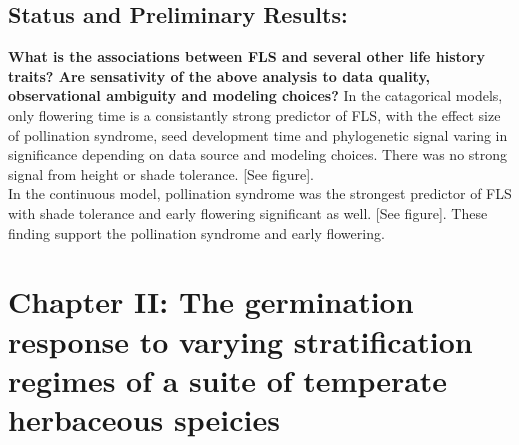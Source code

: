 \documentclass{article}\usepackage[]{graphicx}\usepackage[]{color}
\begin{document}
{{\subsection*{Status and Preliminary Results:}
\textbf{What is the associations between FLS and several other life history traits?  Are sensativity of the above analysis to data quality, observational ambiguity and modeling choices?}
In the catagorical models, only flowering time is a consistantly strong predictor of FLS, with the effect size of pollination syndrome, seed development time and phylogenetic signal varing in significance depending on data source and modeling choices. There was no strong signal from height or shade tolerance. [See figure].\\
In the continuous model, pollination syndrome was the strongest predictor of FLS with shade tolerance and early flowering significant as well. [See figure]. These finding support the pollination syndrome and early flowering.\\


\section*{Chapter II: The germination response to varying stratification regimes of a suite of temperate herbaceous speicies}
}}
\end{document}
